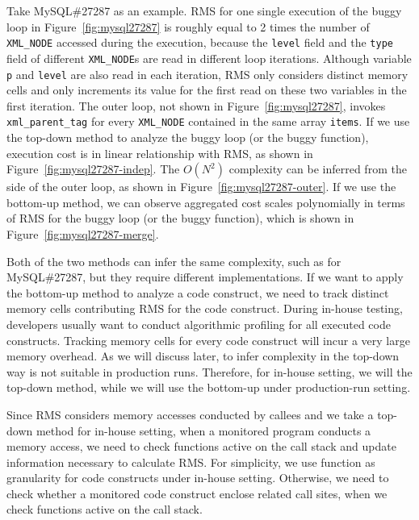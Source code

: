 Take MySQL\#27287 as an example.
RMS for one single execution of
the buggy loop in Figure~\ref{fig:mysql27287}
is roughly equal to 2 times the number of \texttt{XML\_NODE} 
accessed during the execution, 
because the \texttt{level} field and the \texttt{type} field of 
different \texttt{XML\_NODE}s are read in different loop iterations.
Although variable \texttt{p} and \texttt{level} are also read in each iteration,
RMS only considers distinct memory cells and 
only increments its value for the first read on these two variables in the first iteration. 
The outer loop, not shown in Figure~\ref{fig:mysql27287}, 
invokes \texttt{xml\_parent\_tag} for every \texttt{XML\_NODE} contained
in the same array \texttt{items}.
If we use the top-down method to analyze the buggy loop
(or the buggy function), 
execution cost is in linear relationship with RMS, 
as shown in Figure~\ref{fig:mysql27287-indep}.
The $O(N^2)$ complexity can be inferred from the side of the outer loop, 
as shown in Figure~\ref{fig:mysql27287-outer}. 
If we use the bottom-up method, 
we can observe aggregated cost scales 
polynomially in terms of RMS for the buggy loop 
(or the buggy function), 
which is shown in Figure~\ref{fig:mysql27287-merge}. 



Both of the two methods can infer the same complexity, such as for MySQL\#27287,
but they require different implementations.
If we want to apply the bottom-up method to analyze a code construct,
we need to track distinct memory cells contributing RMS for the code construct.
During in-house testing, developers usually want to conduct algorithmic profiling 
for all executed code constructs. 
Tracking memory cells for every code construct will 
incur a very large memory overhead.  
As we will discuss later, to infer complexity in the top-down way 
is not suitable in production runs. 
Therefore, for in-house setting, we will the top-down method, 
while we will use the bottom-up under production-run setting. 

Since RMS considers memory accesses conducted by callees 
and we take a top-down method for in-house setting,
when a monitored program conducts a memory access,
we need to check functions active on the call stack and 
update information necessary to calculate RMS. 
For simplicity, we use function as granularity for code constructs under in-house setting.
Otherwise, we need to check whether a monitored code construct enclose related call sites, 
when we check functions active on the call stack.  

